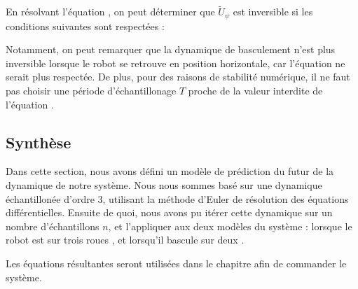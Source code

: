					En résolvant l'équation , on peut déterminer que $\tilde{U}_\psi$ est inversible si les conditions suivantes sont respectées :
					
					Notamment, on peut remarquer que la dynamique de basculement n'est plus inversible lorsque le robot se retrouve en position horizontale, car l'équation  ne serait plus respectée.
					De plus, pour des raisons de stabilité numérique, il ne faut pas choisir une période d'échantillonage $T$ proche de la valeur interdite de l'équation .
					
		\subsection{Synthèse}
		
			Dans cette section, nous avons défini un modèle de prédiction du futur de la dynamique de notre système. 
			Nous nous sommes basé sur une dynamique échantillonée d'ordre 3, utilisant la méthode d'Euler de résolution des équations différentielles.
			Ensuite de quoi, nous avons pu itérer cette dynamique sur un nombre d'échantillons $n$, et l'appliquer aux deux modèles du système : lorsque le robot est sur trois roues , et lorsqu'il bascule sur deux .  
			
			Les équations résultantes  seront utilisées dans le chapitre  afin de commander le système.